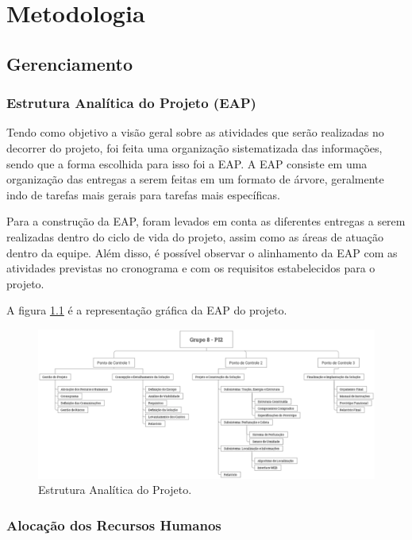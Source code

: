 \chapter{Metodologia}
  \section{Gerenciamento}
    \subsection{Estrutura Analítica do Projeto (EAP)}

Tendo como objetivo a visão geral sobre as atividades que serão
realizadas no decorrer do projeto, foi feita uma organização
sistematizada das informações, sendo que a forma escolhida para
isso foi a EAP. A EAP consiste em uma organização das entregas
a serem feitas em um formato de árvore, geralmente indo de tarefas
mais gerais para tarefas mais específicas. 

Para a construção da EAP, foram levados em conta as diferentes
entregas a serem realizadas dentro do ciclo de vida do projeto,
assim como as áreas de atuação dentro da equipe. Além disso, é
possível observar o alinhamento da EAP com as atividades previstas
no cronograma e com os requisitos estabelecidos para o projeto. 

A figura \ref{fig:eap} é a representação gráfica da EAP do projeto.

\begin{figure}[!htbp]
\begin{center}
\includegraphics[width=\textwidth]{figuras/EAP.eps}
\caption{\label{fig:eap}Estrutura Analítica do Projeto.}
\end{center}
\end{figure}

    \subsection{Alocação dos Recursos Humanos}

